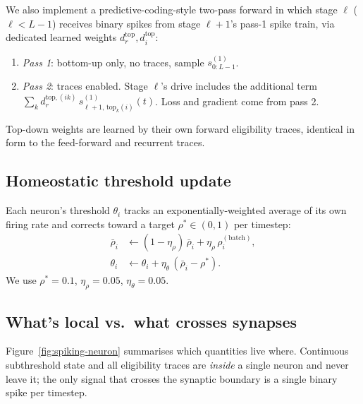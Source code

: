 \documentclass[11pt]{article}
\begin{document}
We also implement a predictive-coding-style two-pass forward in
which stage $\ell$ ($\ell < L-1$) receives binary spikes from stage
$\ell+1$'s pass-1 spike train, via dedicated learned weights
$d_r^{\text{top}}, d_i^{\text{top}}$:
\begin{enumerate}[itemsep=1pt]
\item \emph{Pass 1}: bottom-up only, no traces, sample
$s_{0:L-1}^{(1)}$.
\item \emph{Pass 2}: traces enabled. Stage $\ell$'s drive includes
the additional term
$\sum_k d_r^{\text{top},(ik)} \, s^{(1)}_{\ell+1,\,\text{top}_k(i)}(t)$.
Loss and gradient come from pass 2.
\end{enumerate}
Top-down weights are learned by their own forward eligibility traces,
identical in form to the feed-forward and recurrent traces.

\subsection{Homeostatic threshold update}\label{sec:spiking-homeo}

Each neuron's threshold $\theta_i$ tracks an exponentially-weighted
average of its own firing rate and corrects toward a target
$\rho^* \in (0,1)$ per timestep:
\begin{align}
\bar\rho_i &\leftarrow (1 - \eta_\rho)\,\bar\rho_i + \eta_\rho\,\rho_i^{(\text{batch})},\\
\theta_i  &\leftarrow \theta_i + \eta_\theta\,(\bar\rho_i - \rho^*).
\end{align}
We use $\rho^* = 0.1$, $\eta_\rho = 0.05$, $\eta_\theta = 0.05$.

\subsection{What's local vs.\ what crosses synapses}

Figure~\ref{fig:spiking-neuron} summarises which quantities live where.
Continuous subthreshold state and all eligibility traces are
\emph{inside} a single neuron and never leave it; the only signal
that crosses the synaptic boundary is a single binary spike per
timestep.
\end{document}
